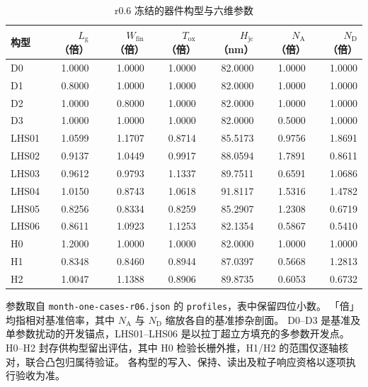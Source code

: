 \begin{table}[tbp]
  \centering
  \small
  \caption{r0.6 冻结的器件构型与六维参数}
  \label{tab:r06-modeling-profiles}
  \begin{tabularx}{\linewidth}{@{}>{\raggedright\arraybackslash}Xrrrrrr@{}}
    \toprule
    构型 & \(L_{\mathrm{g}}\)（倍） & \(W_{\mathrm{fin}}\)（倍） &
    \(T_{\mathrm{ox}}\)（倍） & \(H_{\mathrm{jc}}\)（nm） &
    \(N_{\mathrm{A}}\)（倍） & \(N_{\mathrm{D}}\)（倍） \\
    \midrule
    D0    & 1.0000 & 1.0000 & 1.0000 & 82.0000 & 1.0000 & 1.0000 \\
    D1    & 0.8000 & 1.0000 & 1.0000 & 82.0000 & 1.0000 & 1.0000 \\
    D2    & 1.0000 & 0.8000 & 1.0000 & 82.0000 & 1.0000 & 1.0000 \\
    D3    & 1.0000 & 1.0000 & 1.0000 & 82.0000 & 0.5000 & 1.0000 \\
    \addlinespace
    LHS01 & 1.0599 & 1.1707 & 0.8714 & 85.5173 & 0.9756 & 1.8691 \\
    LHS02 & 0.9137 & 1.0449 & 0.9917 & 88.0594 & 1.7891 & 0.8611 \\
    LHS03 & 0.9612 & 0.9793 & 1.1337 & 89.7511 & 0.6591 & 1.0686 \\
    LHS04 & 1.0150 & 0.8743 & 1.0618 & 91.8117 & 1.5316 & 1.4782 \\
    LHS05 & 0.8256 & 0.8334 & 0.8259 & 85.2907 & 1.2308 & 0.6719 \\
    LHS06 & 0.8611 & 1.0923 & 1.1253 & 82.1354 & 0.5867 & 0.5410 \\
    \addlinespace
    H0    & 1.2000 & 1.0000 & 1.0000 & 82.0000 & 1.0000 & 1.0000 \\
    H1    & 0.8348 & 0.8460 & 0.8944 & 87.0397 & 0.5668 & 1.2813 \\
    H2    & 1.0047 & 1.1388 & 0.8906 & 89.8735 & 0.6053 & 0.6732 \\
    \bottomrule
  \end{tabularx}
  \par\smallskip
  \begin{minipage}{\linewidth}
    \footnotesize
    参数取自 \texttt{month-one-cases-r06.json} 的 \texttt{profiles}，表中保留四位小数。
    「倍」均指相对基准倍率，其中 \(N_{\mathrm{A}}\) 与 \(N_{\mathrm{D}}\) 缩放各自的基准掺杂剖面。
    D0--D3 是基准及单参数扰动的开发锚点，LHS01--LHS06 是以拉丁超立方填充的多参数开发点。
    H0--H2 封存供构型留出评估，其中 H0 检验长栅外推，H1/H2 的范围仅逐轴核对，联合凸包归属待验证。
    各构型的写入、保持、读出及粒子响应资格以逐项执行验收为准。
  \end{minipage}
\end{table}


